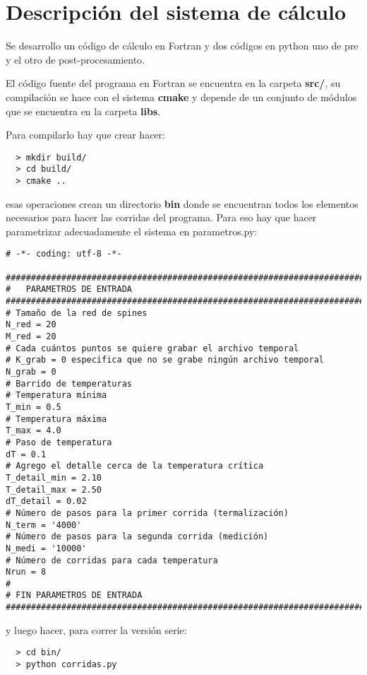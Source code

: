\section{Descripci\'on del sistema de c\'alculo}


Se desarrollo un c\'odigo de c\'alculo en Fortran y dos c\'odigos
en python uno  de pre y el otro de post-procesamiento.

El c\'odigo fuente del programa en Fortran se encuentra en la carpeta
\textbf{src/}, su compilación se hace con el sistema \textbf{cmake} y depende
de un conjunto de módulos que se encuentra en la carpeta \textbf{libs}.

Para compilarlo hay que crear hacer:

\begin{verbatim}
  > mkdir build/
  > cd build/
  > cmake ..
\end{verbatim}

esas operaciones crean un directorio \textbf{bin} donde se encuentran todos
los elementos necesarios para hacer las corridas del programa.
Para eso hay que hacer parametrizar adecuadamente el sistema en parametros.py:

\begin{verbatim}
# -*- coding: utf-8 -*-

###############################################################################       
#   PARAMETROS DE ENTRADA
###############################################################################
# Tamaño de la red de spines
N_red = 20
M_red = 20
# Cada cuántos puntos se quiere grabar el archivo temporal
# K_grab = 0 especifica que no se grabe ningún archivo temporal
N_grab = 0     
# Barrido de temperaturas
# Temperatura mínima
T_min = 0.5
# Temperatura máxima
T_max = 4.0
# Paso de temperatura
dT = 0.1
# Agrego el detalle cerca de la temperatura crítica
T_detail_min = 2.10
T_detail_max = 2.50
dT_detail = 0.02
# Número de pasos para la primer corrida (termalización)
N_term = '4000'
# Número de pasos para la segunda corrida (medición)
N_medi = '10000'
# Número de corridas para cada temperatura
Nrun = 8
#
# FIN PARAMETROS DE ENTRADA
###############################################################################

\end{verbatim}


y luego hacer, para correr la versión serie:

\begin{verbatim}
  > cd bin/
  > python corridas.py
\end{verbatim}

